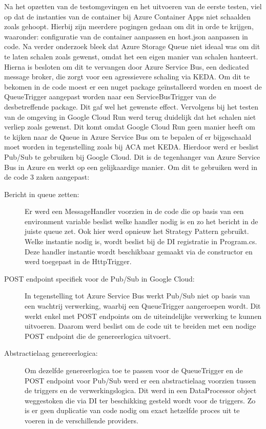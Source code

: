 Na het opzetten van de testomgevingen en het uitvoeren van de eerste testen, viel op dat de instanties van de container bij Azure Container Apps niet schaalden zoals gehoopt. Hierbij zijn meerdere pogingen gedaan om dit in orde te krijgen, waaronder: configuratie van de container aanpassen en host.json aanpassen in code. Na verder onderzoek bleek dat Azure Storage Queue niet ideaal was om dit te laten schalen zoals gewenst, omdat het een eigen manier van schalen hanteert. Hierna is besloten om dit te vervangen door Azure Service Bus, een dedicated message broker, die zorgt voor een agressievere schaling via KEDA. Om dit te bekomen in de code moest er een nuget package geïnstalleerd worden en moest de QueueTrigger aangepast worden naar een ServiceBusTrigger van de desbetreffende package. Dit gaf wel het gewenste effect. Vervolgens bij het testen van de omgeving in Google Cloud Run werd terug duidelijk dat het schalen niet verliep zoals gewenst. Dit komt omdat Google Cloud Run geen manier heeft om te kijken naar de Queue in Azure Service Bus om te bepalen of er bijgeschaald moet worden in tegenstelling zoals bij ACA met KEDA. Hierdoor werd er beslist Pub/Sub te gebruiken bij Google Cloud. Dit is de tegenhanger van Azure Service Bus in Azure en werkt op een gelijkaardige manier. Om dit te gebruiken werd in de code 3 zaken aangepast:

\begin{description}
    \item[Bericht in queue zetten:] Er werd een MessageHandler voorzien in de code die op basis van een environment variable beslist welke handler nodig is en zo het bericht in de juiste queue zet. Ook hier werd opnieuw het Strategy Pattern gebruikt. Welke instantie nodig is, wordt beslist bij de DI registratie in Program.cs. Deze handler instantie wordt beschikbaar gemaakt via de constructor en werd toegepast in de HttpTrigger.
    \item[POST endpoint specifiek voor de Pub/Sub in Google Cloud:] In tegenstelling tot Azure Service Bus werkt Pub/Sub niet op basis van een wachtrij verwerking, waarbij een QueueTrigger aangeroepen wordt. Dit werkt enkel met POST endpoints om de uiteindelijke verwerking te kunnen uitvoeren. Daarom werd beslist om de code uit te breiden met een nodige POST endpoint die de genereerlogica uitvoert.  
    \item[Abstractielaag genereerlogica:] Om dezelfde genereerlogica toe te passen voor de QueueTrigger en de POST endpoint voor Pub/Sub werd er een abstractielaag voorzien tussen de triggers en de verwerkingslogica. Dit werd in een DataProcessor object weggestoken die via DI ter beschikking gesteld wordt voor de triggers. Zo is er geen duplicatie van code nodig om exact hetzelfde proces uit te voeren in de verschillende providers.
\end{description}

